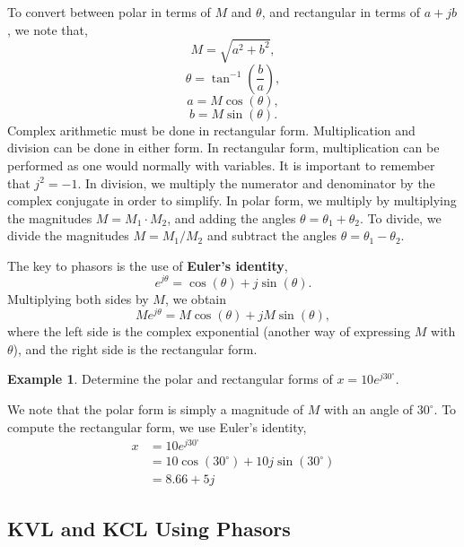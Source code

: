 \documentclass[11pt]{article}
\theoremstyle{plain} %
\theoremstyle{definition}
\theoremstyle{example}
\newtheorem*{example}{Example}
\theoremstyle{remark}
\begin{document}
To convert between polar in terms of $M$ and $\theta$, and rectangular in terms of $a+jb$, we note that,
$$M = \sqrt{a^2+b^2},$$
$$\theta = \tan^{-1}\left(\frac{b}{a}\right),$$
$$a = M\cos(\theta),$$
$$b = M\sin(\theta).$$
Complex arithmetic must be done in rectangular form. Multiplication and division can be done in either form. In rectangular form, multiplication can be performed as one would normally with variables. It is important to remember that $j^2 = -1$. In division, we multiply the numerator and denominator by the complex conjugate in order to simplify. In polar form, we multiply by multiplying the magnitudes $M = M_1\cdot M_2$, and adding the angles $\theta = \theta_1+\theta_2$. To divide, we divide the magnitudes $M = M_1/M_2$ and subtract the angles $\theta = \theta_1-\theta_2$. 

The key to phasors is the use of \textbf{Euler's identity},
$$e^{j\theta} = \cos(\theta) + j\sin(\theta).$$
Multiplying both sides by $M$, we obtain
$$Me^{j\theta} = M\cos(\theta) + jM\sin(\theta),$$
where the left side is the complex exponential (another way of expressing $M$ with $\theta$), and the right side is the rectangular form. 

\begin{example}
Determine the polar and rectangular forms of $x = 10e^{j30^{\circ}}$. 
\end{example}
We note that the polar form is simply a magnitude of $M$ with an angle of $30^{\circ}$. To compute the rectangular form, we use Euler's identity, 
\begin{align*}
	x &= 10e^{j30^{\circ}} \\
	&= 10\cos(30^{\circ}) + 10j\sin(30^{\circ})\\
	&= 8.66 + 5j
\end{align*}

\subsection{KVL and KCL Using Phasors}
\end{document}
